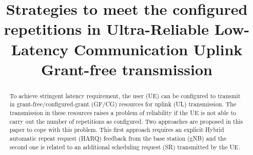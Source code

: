 \documentclass[conference]{IEEEtran}
\begin{document}
\title{Strategies to meet the configured repetitions in Ultra-Reliable Low-Latency Communication Uplink Grant-free transmission\\
}

\author{
\and
{}
}

\maketitle

\begin{abstract}
To achieve stringent latency requirement, the user (UE) can be configured to transmit in grant-free/configured-grant (GF/CG) resources for  uplink (UL) transmission. The transmission in these resources raises a problem of reliability if the UE is not able to carry out the number of repetitions as configured. Two approaches are proposed in this paper to cope with this problem. This first approach requires an explicit Hybrid automatic repeat request (HARQ) feedback from the base station (gNB) and the second one is related to an additional scheduling request (SR) transmitted by the UE.
\end{abstract}
\end{document}
